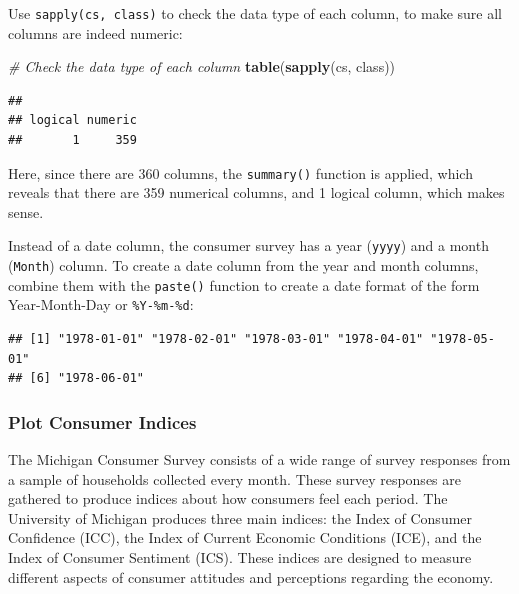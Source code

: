 \documentclass[
]{book}
\newenvironment{Shaded}{\begin{snugshade}}{\end{snugshade}}
\newcommand{\AttributeTok}[1]{\textcolor[rgb]{0.13,0.29,0.53}{#1}}
\newcommand{\CommentTok}[1]{\textcolor[rgb]{0.56,0.35,0.01}{\textit{#1}}}
\newcommand{\FunctionTok}[1]{\textcolor[rgb]{0.13,0.29,0.53}{\textbf{#1}}}
\newcommand{\NormalTok}[1]{#1}
\newcommand{\OtherTok}[1]{\textcolor[rgb]{0.56,0.35,0.01}{#1}}
\newcommand{\SpecialCharTok}[1]{\textcolor[rgb]{0.81,0.36,0.00}{\textbf{#1}}}
\newcommand{\StringTok}[1]{\textcolor[rgb]{0.31,0.60,0.02}{#1}}
\begin{document}
Use \texttt{sapply(cs,\ class)} to check the data type of each column, to make sure all columns are indeed numeric:

\begin{Shaded}
\begin{Highlighting}[]
\CommentTok{\# Check the data type of each column}
\FunctionTok{table}\NormalTok{(}\FunctionTok{sapply}\NormalTok{(cs, class))}
\end{Highlighting}
\end{Shaded}

\begin{verbatim}
## 
## logical numeric 
##       1     359
\end{verbatim}

Here, since there are 360 columns, the \texttt{summary()} function is applied, which reveals that there are 359 numerical columns, and 1 logical column, which makes sense.

Instead of a date column, the consumer survey has a year (\texttt{yyyy}) and a month (\texttt{Month}) column. To create a date column from the year and month columns, combine them with the \texttt{paste()} function to create a date format of the form Year-Month-Day or \texttt{\%Y-\%m-\%d}:

\begin{Shaded}
\end{Shaded}

\begin{verbatim}
## [1] "1978-01-01" "1978-02-01" "1978-03-01" "1978-04-01" "1978-05-01"
## [6] "1978-06-01"
\end{verbatim}

\hypertarget{plot-consumer-indices}{%
\subsubsection*{Plot Consumer Indices}\label{plot-consumer-indices}}

The Michigan Consumer Survey consists of a wide range of survey responses from a sample of households collected every month. These survey responses are gathered to produce indices about how consumers feel each period. The University of Michigan produces three main indices: the Index of Consumer Confidence (ICC), the Index of Current Economic Conditions (ICE), and the Index of Consumer Sentiment (ICS). These indices are designed to measure different aspects of consumer attitudes and perceptions regarding the economy.
\end{document}
